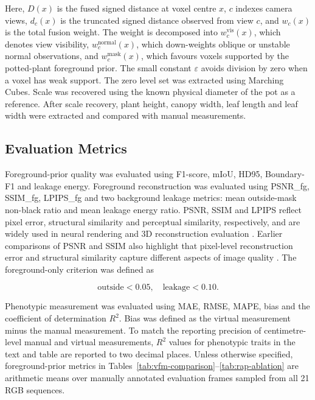 \documentclass[a4paper]{cas-sc}
\begin{document}
Here, \(D(x)\) is the fused signed distance at voxel centre \(x\), \(c\) indexes camera views, \(d_c(x)\) is the truncated signed distance observed from view \(c\), and \(w_c(x)\) is the total fusion weight. The weight is decomposed into \(w_c^{\text{vis}}(x)\), which denotes view visibility, \(w_c^{\text{normal}}(x)\), which down-weights oblique or unstable normal observations, and \(w_c^{\text{mask}}(x)\), which favours voxels supported by the potted-plant foreground prior. The small constant \(\varepsilon\) avoids division by zero when a voxel has weak support. The zero level set was extracted using Marching Cubes. Scale was recovered using the known physical diameter of the pot as a reference. After scale recovery, plant height, canopy width, leaf length and leaf width were extracted and compared with manual measurements.

\subsection{Evaluation Metrics}\label{sec:evaluation-metrics}

Foreground-prior quality was evaluated using F1-score, mIoU, HD95, Boundary-F1 and leakage energy. Foreground reconstruction was evaluated using PSNR\_fg, SSIM\_fg, LPIPS\_fg and two background leakage metrics: mean outside-mask non-black ratio and mean leakage energy ratio. PSNR, SSIM and LPIPS reflect pixel error, structural similarity and perceptual similarity, respectively, and are widely used in neural rendering and 3D reconstruction evaluation \cite{ref48,ref49}. Earlier comparisons of PSNR and SSIM also highlight that pixel-level reconstruction error and structural similarity capture different aspects of image quality \cite{ref47}. The foreground-only criterion was defined as

\[
\text{outside}<0.05,\quad \text{leakage}<0.10.
\]

Phenotypic measurement was evaluated using MAE, RMSE, MAPE, bias and the coefficient of determination \(R^2\). Bias was defined as the virtual measurement minus the manual measurement. To match the reporting precision of centimetre-level manual and virtual measurements, \(R^2\) values for phenotypic traits in the text and table are reported to two decimal places. Unless otherwise specified, foreground-prior metrics in Tables~\ref{tab:vfm-comparison}--\ref{tab:rap-ablation} are arithmetic means over manually annotated evaluation frames sampled from all 21 RGB sequences.
\end{document}
